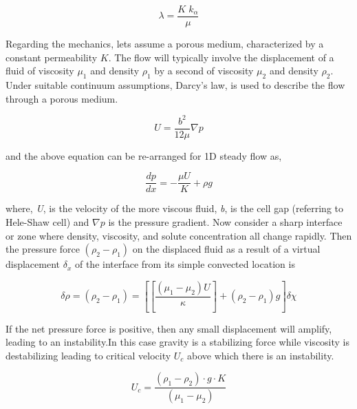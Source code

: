 \documentclass[preprint,authoryear,12pt]{elsarticle}
\begin{document}
\begin{equation}
\lambda = \frac{K\;k_{\alpha}}{\mu}
\label{eq:mobility-of-fluid}
\end{equation}

\noindent Regarding the mechanics, lets assume a porous medium, characterized by a constant permeability $K$. The flow will typically involve the displacement of a fluid of viscosity $\mu_1$  and density $\rho_1$ by a second of viscosity $\mu_2$ and density $\rho_2$. Under suitable continuum assumptions, Darcy's law, is used to describe the flow through a porous medium.

\begin{equation}
 U = \frac{b^2}{12 \mu} \nabla p
\end{equation}

and the above equation can be re-arranged for 1D steady flow as,

\begin{equation}
 \frac{dp}{dx}= - \frac{\mu U}{K} + \rho g 
\end{equation}

where, \textit{U}, is the velocity of the more viscous fluid, \textit{b}, is the cell gap (referring to Hele-Shaw cell) and \textit{$\nabla p$} is the pressure gradient. Now consider a sharp interface or zone where density, viscosity, and solute concentration all change rapidly. Then the pressure force $(\rho_2-\rho_1)$ on the displaced fluid as a result of a virtual displacement $\delta_x$ of the interface from its simple convected location is 

\begin{equation}
\delta\rho=(\rho_2-\rho_1)=[[\frac{(\mu_1-\mu_2)U}{\kappa}]+(\rho_2-\rho_1)g] \delta\chi
\end{equation}

If the net pressure force is positive, then any small displacement will amplify, leading to an instability.In this case gravity is a stabilizing force while viscosity is destabilizing leading to critical velocity $U_c$ above which there is an instability.

\begin{equation}
U_c = \frac{(\rho_1-\rho_2) \cdot g \cdot K}{(\mu_1-\mu_2)}
\end{equation}

  
\end{document}
